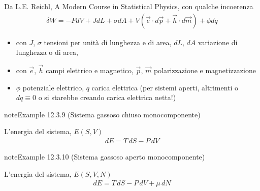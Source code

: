 \documentclass[letterpaper,10pt,italian]{jupyterBook}
\begin{document}
\sphinxAtStartPar
Da L.E. Reichl, A Modern Course in Statistical Physics, con qualche incoerenza  
\begin{equation*}
\begin{split}\delta W = - P dV + J dL + \sigma d A + V \left( \vec{e} \cdot d \vec{p} + \vec{h} \cdot d \vec{m}\right) + \phi d q \end{split}
\end{equation*}\begin{itemize}
\item {} 
\sphinxAtStartPar
con \(J\), \(\sigma\) tensioni per unità di lunghezza e di area, \(d L \), \(d A\) variazione di lunghezza o di area,

\item {} 
\sphinxAtStartPar
con \(\vec{e}\), \(\vec{h}\) campi elettrico e magnetico, \(\vec{p}\), \(\vec{m}\) polarizzazione e magnetizzazione

\item {} 
\sphinxAtStartPar
\(\phi\) potenziale elettrico, \(q\) carica elettrica (per sistemi aperti, altrimenti o \(dq \equiv 0\) o si starebbe creando carica elettrica netta!)

\end{itemize}
\label{ch/thermodynamics/principles-gibbs-phase-rule:example-12}
\begin{sphinxadmonition}{note}{Example 12.3.9 (Sistema gassoso chiuso monocomponente)}



\sphinxAtStartPar
L’energia del sistema, \(E(S,V)\)
\begin{equation*}
\begin{split}dE = T \, dS - P \, dV\end{split}
\end{equation*}\end{sphinxadmonition}
\label{ch/thermodynamics/principles-gibbs-phase-rule:example-13}
\begin{sphinxadmonition}{note}{Example 12.3.10 (Sistema gassoso aperto monocomponente)}



\sphinxAtStartPar
L’energia del sistema, \(E(S,V,N)\)
\begin{equation*}
\begin{split}dE = T \, dS - P \, dV + \mu \, dN\end{split}
\end{equation*}\end{sphinxadmonition}
\label{ch/thermodynamics/principles-gibbs-phase-rule:example-14}
\end{document}
